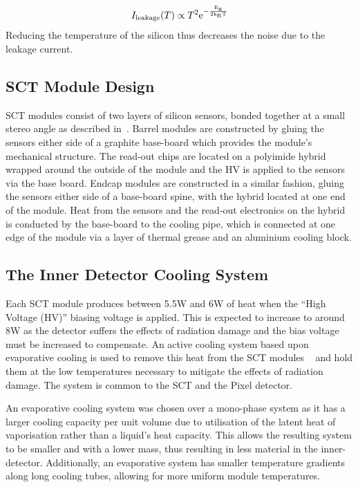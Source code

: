 \begin{equation}
I_{\rm{leakage}} (T) \propto T^{2} \rm{e}^{-\frac{E_{g}}{2k_{B}T}}
\end{equation}
Reducing the temperature of the silicon thus decreases the noise due to the leakage
current.

\subsection{SCT Module Design}

SCT modules consist of two layers of silicon sensors, bonded together at a small
stereo angle as described in~. Barrel modules are constructed
by gluing the sensors either side of a graphite base-board
which provides the module's mechanical structure. The read-out chips are located on a
polyimide hybrid wrapped around the outside of the module and the HV is applied
to the sensors via the base board. Endcap modules are constructed in a similar
fashion, gluing the sensors either side of a base-board spine, with the hybrid
located at one end of the module.  
Heat from the sensors and the read-out electronics on the hybrid is conducted by
the base-board to the cooling pipe, which is connected at one edge of the module
via a layer of thermal grease and an aluminium cooling block.

\subsection{The Inner Detector Cooling System}
\label{sec:SCT-CoolingDesc}
Each SCT module produces between 5.5W and 6W of heat when the ``High
Voltage (HV)'' biasing voltage is applied. This is expected
to increase to around 8W as the detector suffers the effects of radiation
damage and the bias voltage must be increased to compensate. 
An active cooling system based upon
evaporative cooling is used to remove this heat from the SCT modules
~\cite{1748-0221-3-07-P07003} and hold them at the low temperatures necessary to
mitigate the effects of radiation damage. The system is common to the SCT and
the Pixel detector. 

An evaporative cooling system was chosen over a mono-phase system as it has a
larger cooling capacity per unit volume due to utilisation of the latent heat of
vaporisation rather than a liquid's heat capacity. This allows the resulting
system to be smaller and with a lower mass, thus resulting in less material in
the inner-detector. Additionally, an evaporative system has
smaller temperature gradients along long cooling tubes, allowing for more
uniform module temperatures.

